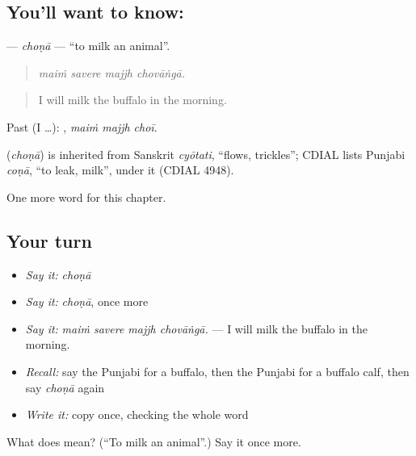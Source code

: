 \subsection*{You'll want to know: }
\textbf{} — \emph{choṇā} — \textquotedblleft{}to milk an animal\textquotedblright{}.

\begin{quote}
   
\end{quote}

\begin{quote}
\emph{maiṁ savere majjh chovāṅgā.}
\end{quote}

\begin{quote}
I will milk the buffalo in the morning.
\end{quote}

Past (I …):   , \emph{maiṁ majjh choī}.

\begin{cousinweb}
\textbf{} (\emph{choṇā}) is inherited from Sanskrit \emph{cyōtati}, \textquotedblleft{}flows, trickles\textquotedblright{}; CDIAL lists Punjabi \emph{coṇā}, \textquotedblleft{}to leak, milk\textquotedblright{}, under it (CDIAL 4948).
\end{cousinweb}

\begin{grammarlens}[title={What you've built}]
One more word for this chapter.
\end{grammarlens}

\subsection*{Your turn}
\begin{itemize}
\raggedright
  \item \emph{Say it:} \emph{choṇā}
  \item \emph{Say it:} \emph{choṇā}, once more
  \item \emph{Say it:} \emph{maiṁ savere majjh chovāṅgā.} — I will milk the buffalo in the morning.
  \item \emph{Recall:} say the Punjabi for a buffalo, then the Punjabi for a buffalo calf, then say \emph{choṇā} again
  \item \emph{Write it:} copy \textbf{} once, checking the whole word
\end{itemize}

\begin{tcolorbox}[breakable,colback=teal!4,colframe=teal!35!black,title={Before you move on}]
What does  mean? (\textquotedblleft{}To milk an animal\textquotedblright{}.) Say it once more.
\end{tcolorbox}
